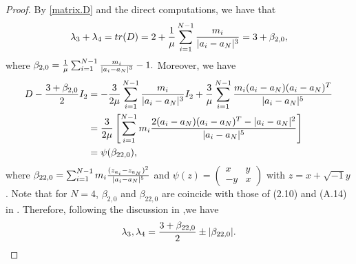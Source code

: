 \documentclass[11pt]{article}
\def\lb{\label}
\begin{document}
\begin{proof}
By \eqref{matrix.D} and the direct computations, we have that 
\begin{align}\lb{eqn:sum.l3.l4}
  \lambda_3+\lambda_4 =tr(D)
  =2+{1\over\mu}\sum_{i=1}^{N-1}{m_i\over|a_i-a_N|^3} 
  =3+\beta_{2,0},
  \end{align}
where $\beta_{2,0}={1\over\mu}\sum_{i=1}^{N-1}{m_i\over|a_i-a_N|^3}-1.$
Moreover, we have
\begin{align}
  D-{3+\beta_{2,0}\over2}I_2
&=-{3\over2\mu}\sum_{i=1}^{N-1}{m_i\over|a_i-a_N|^3}I_2
 +{3\over\mu}\sum_{i=1}^{N-1}{m_i(a_i-a_N)(a_i-a_N)^T\over|a_i-a_N|^5}
 \\
&={3\over2\mu}\left[\sum_{i=1}^{N-1}m_i{2(a_i-a_N)(a_i-a_N)^T-|a_i-a_N|^2\over|a_i-a_N|^5}\right]\\
&=\psi(\beta_{22,0}),
\end{align}
where
$\beta_{22,0}=\sum_{i=1}^{N-1}m_i{(z_{a_i}-z_{a_N})^2\over|a_i-a_N|^5}$
and $\psi(z) = (\begin{smallmatrix}
  x & y\\-y & x
\end{smallmatrix})$ with $z = x+ \sqrt{-1} y$.
Note that for $N=4$,  $\beta_{2,0}$ and $\beta_{22,0}$ are coincide with
those of (2.10) and (A.14) in \cite{LiZ}.
Therefore, following the discussion in \cite{LiZ},we have
\begin{align}\lb{eqn:l3l4}
  \lambda_3,\lambda_4={3+\beta_{22,0}\over2}\pm|\beta_{22,0}|.
\end{align}




\end{proof}
\end{document}
